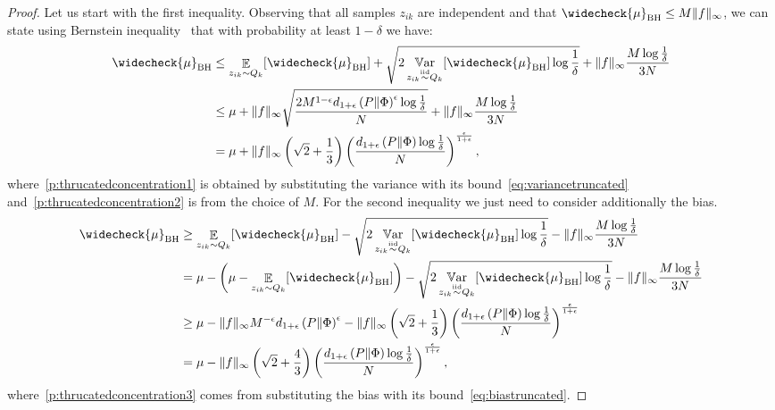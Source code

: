 \documentclass{article}
\begin{document}
\thrucatedconcentration*

\begin{proof}
Let us start with the first inequality. Observing that all samples $z_{ik}$ are independent and that $\widecheck{\mu}_{\text{BH}} \le M \|f\|_{\infty}$, we can state using Bernstein inequality~\cite{boucheron2013concentration} that with probability at least $1-\delta$ we have:
    \begin{align}
         \widecheck{\mu}_{\text{BH}} & \le \Exp_{z_{ik} \sim Q_k} [\widecheck{\mu}_{\text{BH}}] + \sqrt{2 \Var_{z_{ik} \simiid Q_k}[\widecheck{\mu}_{\text{BH}}] \log \frac{1}{\delta}} +\|f\|_{\infty}  \frac{M  \log \frac{1}{\delta}}{3N} \notag \\
         & \le \mu + \|f\|_{\infty} \sqrt{\frac{2 M^{1-\epsilon} d_{1+\epsilon}\left( P \| \Phi \right)^{\epsilon} \log  \frac{1}{\delta} }{N}} +\|f\|_{\infty} \frac{M \log \frac{1}{\delta}}{3N} \label{p:thrucatedconcentration1}\\
       & = \mu + \|f\|_{\infty}\left(\sqrt{2} + \frac{1}{3} \right)  \left(\frac{d_{1+\epsilon}\left( P \| \Phi  \right) \log  \frac{1}{\delta}  }{N} \right)^{\frac{\epsilon}{1+\epsilon}} \label{p:thrucatedconcentration2},
    \end{align}
    where~\eqref{p:thrucatedconcentration1} is obtained by substituting the variance with its bound~\eqref{eq:variancetruncated} and~\eqref{p:thrucatedconcentration2} is from the choice of $M$.
    For the second inequality we just need to consider additionally the bias.
    \begin{align}
         \widecheck{\mu}_{\text{BH}} & \ge  \Exp_{z_{ik} \sim Q_k} [\widecheck{\mu}_{\text{BH}}] - \sqrt{2 \Var_{z_{ik} \simiid Q_k}[\widecheck{\mu}_{\text{BH}}] \log \frac{1}{\delta}} -\|f\|_{\infty}  \frac{M  \log \frac{1}{\delta}}{3N} \notag\\
         & = \mu - \left(\mu - \Exp_{z_{ik} \sim Q_k} [\widecheck{\mu}_{\text{BH}}] \right) -\sqrt{2 \Var_{z_{ik} \simiid Q_k}[\widecheck{\mu}_{\text{BH}}] \log \frac{1}{\delta}} -\|f\|_{\infty}  \frac{M  \log \frac{1}{\delta}}{3N}  \notag\\
          & \ge \mu - \|f\|_{\infty} M^{-\epsilon} d_{1+\epsilon}\left( P \| \Phi \right)^{\epsilon} - \|f\|_{\infty}\left(\sqrt{2} + \frac{1}{3} \right)  \left(\frac{d_{1+\epsilon}\left( P \| \Phi  \right) \log  \frac{1}{\delta}  }{N} \right)^{\frac{\epsilon}{1+\epsilon}} \label{p:thrucatedconcentration3}\\
          & = \mu - \|f\|_{\infty} \left(\sqrt{2} + \frac{4}{3} \right) \left(\frac{d_{1+\epsilon}\left( P \| \Phi  \right) \log  \frac{1}{\delta}  }{N} \right)^{\frac{\epsilon}{1+\epsilon}}, \notag\\
    \end{align}
    where~\eqref{p:thrucatedconcentration3} comes from substituting the bias with its bound~\eqref{eq:biastruncated}.
\end{proof}
\end{document}
